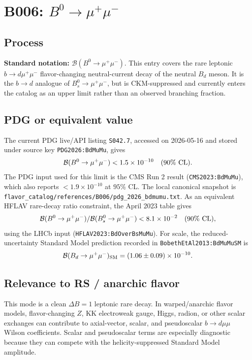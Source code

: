 
\section{B006: \(B^0\to\mu^+\mu^-\)}

\subsection*{Process}
\textbf{Standard notation:} \(\mathcal{B}(B^0\to\mu^+\mu^-)\).
This entry covers the rare leptonic \(b\to d\mu^+\mu^-\) flavor-changing
neutral-current decay of the neutral \(B_d\) meson.  It is the \(b\to d\)
analogue of \(B_s^0\to\mu^+\mu^-\), but is CKM-suppressed and currently enters
the catalog as an upper limit rather than an observed branching fraction.

\subsection*{PDG or equivalent value}
The current PDG live/API listing \texttt{S042.7}, accessed on 2026-05-16 and
stored under source key \texttt{PDG2026:BdMuMu}, gives
\[
  \mathcal{B}(B^0\to\mu^+\mu^-) < 1.5\times10^{-10}\quad(90\%\ {\rm CL}).
\]
The PDG input used for this limit is the CMS Run 2 result
(\texttt{CMS2023:BdMuMu}), which also reports
\(<1.9\times10^{-10}\) at \(95\%\) CL.  The local canonical snapshot is
\texttt{flavor\_catalog/references/B006/pdg\_2026\_bdmumu.txt}.  As an
equivalent HFLAV rare-decay ratio constraint, the April 2023 table gives
\[
  \mathcal{B}(B^0\to\mu^+\mu^-)/\mathcal{B}(B_s^0\to\mu^+\mu^-) < 8.1\times10^{-2}
  \quad(90\%\ {\rm CL}),
\]
using the LHCb input (\texttt{HFLAV2023:BdOverBsMuMu}).  For scale, the
reduced-uncertainty Standard Model prediction recorded in
\texttt{BobethEtAl2013:BdMuMuSM} is
\[
  \mathcal{B}(B_d\to\mu^+\mu^-)_{\rm SM}=(1.06\pm0.09)\times10^{-10}.
\]

\subsection*{Relevance to RS / anarchic flavor}
This mode is a clean \(\Delta B=1\) leptonic rare decay.  In warped/anarchic
flavor models, flavor-changing \(Z\), KK electroweak gauge, Higgs, radion, or
other scalar exchanges can contribute to axial-vector, scalar, and pseudoscalar
\(b\to d\mu\mu\) Wilson coefficients.  Scalar and pseudoscalar terms are
especially diagnostic because they can compete with the helicity-suppressed
Standard Model amplitude.


